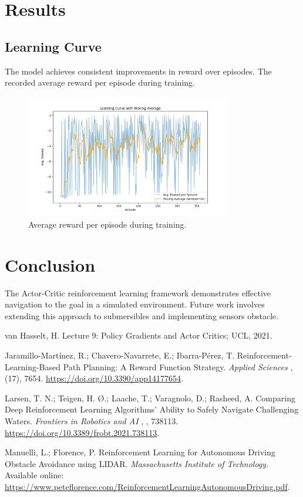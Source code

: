 \documentclass[12pt]{article}
\begin{document}
\section{Results}

\subsection{Learning Curve}
The model achieves consistent improvements in reward over episodes. The recorded average reward per episode during training.

\begin{figure}[H]
    \centering
    \includegraphics[width=0.8\textwidth]{report/images/learning.png}
    \caption{Average reward per episode during training.}
    \label{fig:learning_curve}
\end{figure}

\section{Conclusion}
The Actor-Critic reinforcement learning framework demonstrates effective navigation to the goal in a simulated environment. Future work involves extending this approach to submersibles and implementing sensors obstacle.

\begin{thebibliography}{}
\raggedright

van Hasselt, H. Lecture 9: Policy Gradients and Actor Critics; UCL, 2021. 

Jaramillo-Martínez, R.; Chavero-Navarrete, E.; Ibarra-Pérez, T. Reinforcement-Learning-Based Path Planning: A Reward Function Strategy. \textit{Applied Sciences} ,  (17), 7654. \url{https://doi.org/10.3390/app14177654}.

Larsen, T. N.; Teigen, H. Ø.; Laache, T.; Varagnolo, D.; Rasheed, A. Comparing Deep Reinforcement Learning Algorithms’ Ability to Safely Navigate Challenging Waters. \textit{Frontiers in Robotics and AI} , , 738113. \url{https://doi.org/10.3389/frobt.2021.738113}.

Manuelli, L.; Florence, P. Reinforcement Learning for Autonomous Driving Obstacle Avoidance using LIDAR. \textit{Massachusetts Institute of Technology.} Available online: \url{https://www.peteflorence.com/ReinforcementLearningAutonomousDriving.pdf}.

\end{thebibliography}
\end{document}
